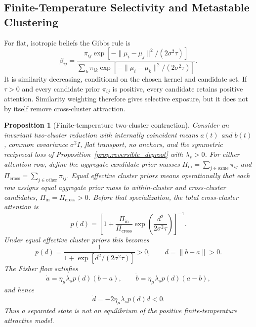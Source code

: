 \documentclass[12pt]{article}
\newtheorem{proposition}[theorem]{Proposition}
\begin{document}
\subsection{Finite-Temperature Selectivity and Metastable Clustering}

For flat, isotropic beliefs the Gibbs rule is
\begin{equation}
\beta_{ij}
=\frac{\pi_{ij}\exp[-\|\mu_i-\mu_j\|^2/(2\sigma^2\tau)]}
{\sum_k\pi_{ik}\exp[-\|\mu_i-\mu_k\|^2/(2\sigma^2\tau)]}.
\label{eq:social_gibbs_kernel}
\end{equation}
It is similarity decreasing, conditional on the chosen kernel and candidate set.  If $\tau>0$ and every candidate prior $\pi_{ij}$ is positive, every candidate retains positive attention.  Similarity weighting therefore gives selective exposure, but it does not by itself remove cross-cluster attraction.

\begin{proposition}[Finite-temperature two-cluster contraction]
\label{prop:finite_temperature_contraction}
Consider an invariant two-cluster reduction with internally coincident means $a(t)$ and $b(t)$, common covariance $\sigma^2I$, flat transport, no anchors, and the symmetric reciprocal loss of Proposition~\ref{prop:reversible_degroot} with $\lambda_s>0$.  For either attention row, define the aggregate candidate-prior masses $\Pi_{\mathrm{in}}=\sum_{j\in\mathrm{same}}\pi_{ij}$ and $\Pi_{\mathrm{cross}}=\sum_{j\in\mathrm{other}}\pi_{ij}$.  Equal effective cluster priors means operationally that each row assigns equal aggregate prior mass to within-cluster and cross-cluster candidates, $\Pi_{\mathrm{in}}=\Pi_{\mathrm{cross}}>0$.  Before that specialization, the total cross-cluster attention is
\begin{equation}
p(d)=\left[1+\frac{\Pi_{\mathrm{in}}}{\Pi_{\mathrm{cross}}}
\exp\!\left(\frac{d^2}{2\sigma^2\tau}\right)\right]^{-1}.
\label{eq:unequal_cluster_cross_attention}
\end{equation}
Under equal effective cluster priors this becomes
\begin{equation}
p(d)=\frac{1}{1+\exp[d^2/(2\sigma^2\tau)]}>0,
\qquad d=\|b-a\|>0.
\label{eq:equal_cluster_cross_attention}
\end{equation}
The Fisher flow satisfies
\begin{equation}
\dot a=\eta_\mu\lambda_s p(d)(b-a),
\qquad
\dot b=\eta_\mu\lambda_s p(d)(a-b),
\end{equation}
and hence
\begin{equation}
\boxed{\dot d
=-2\eta_\mu\lambda_s p(d)d<0.}
\label{eq:strict_cluster_contraction}
\end{equation}
Thus a separated state is not an equilibrium of the positive finite-temperature attractive model.
\end{proposition}
\end{document}
